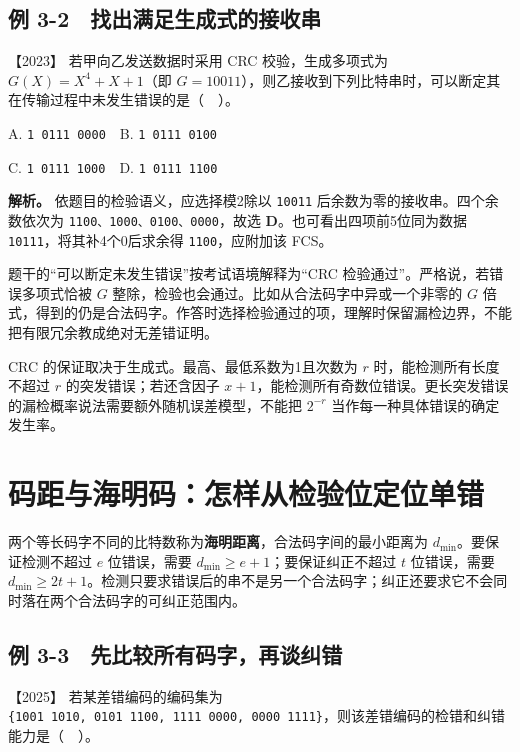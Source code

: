 \subsection{例 3-2　找出满足生成式的接收串}\label{cn-ex3-2}

\noindent{}【2023】 若甲向乙发送数据时采用 CRC 校验，生成多项式为 \(G(X)=X^4+X+1\)（即 \(G=10011\)），则乙接收到下列比特串时，可以断定其在传输过程中未发生错误的是（　）。

A. \allowbreak{}\texttt{1\ 0111\ 0000}　B. \allowbreak{}\texttt{1\ 0111\ 0100}

C. \allowbreak{}\texttt{1\ 0111\ 1000}　D. \allowbreak{}\texttt{1\ 0111\ 1100}


\textbf{解析。} 依题目的检验语义，应选择模2除以 \allowbreak{}\texttt{10011} 后余数为零的接收串。四个余数依次为 \allowbreak{}\texttt{1100、1000、0100、0000}，故选 \textbf{D}。也可看出四项前5位同为数据 \allowbreak{}\texttt{10111}，将其补4个0后求余得 \allowbreak{}\texttt{1100}，应附加该 FCS。

题干的``可以断定未发生错误''按考试语境解释为``CRC 检验通过''。严格说，若错误多项式恰被 \(G\) 整除，检验也会通过。比如从合法码字中异或一个非零的 \(G\) 倍式，得到的仍是合法码字。作答时选择检验通过的项，理解时保留漏检边界，不能把有限冗余教成绝对无差错证明。

CRC 的保证取决于生成式。最高、最低系数为1且次数为 \(r\) 时，能检测所有长度不超过 \(r\) 的突发错误；若还含因子 \(x+1\)，能检测所有奇数位错误。更长突发错误的漏检概率说法需要额外随机误差模型，不能把 \(2^{-r}\) 当作每一种具体错误的确定发生率。

\section{码距与海明码：怎样从检验位定位单错}\label{cn-03-04}

两个等长码字不同的比特数称为\textbf{海明距离}，合法码字间的最小距离为 \(d_{\min}\)。要保证检测不超过 \(e\) 位错误，需要 \(d_{\min}\ge e+1\)；要保证纠正不超过 \(t\) 位错误，需要 \(d_{\min}\ge2t+1\)。检测只要求错误后的串不是另一个合法码字；纠正还要求它不会同时落在两个合法码字的可纠正范围内。

\subsection{例 3-3　先比较所有码字，再谈纠错}\label{cn-ex3-3}

\noindent{}【2025】 若某差错编码的编码集为 \allowbreak{}\texttt{\{1001\ 1010,}\allowbreak{}\texttt{\ 0101\ 1100,}\allowbreak{}\texttt{\ 1111\ 0000,}\allowbreak{}\texttt{\ 0000\ 1111\}}，则该差错编码的检错和纠错能力是（　）。

